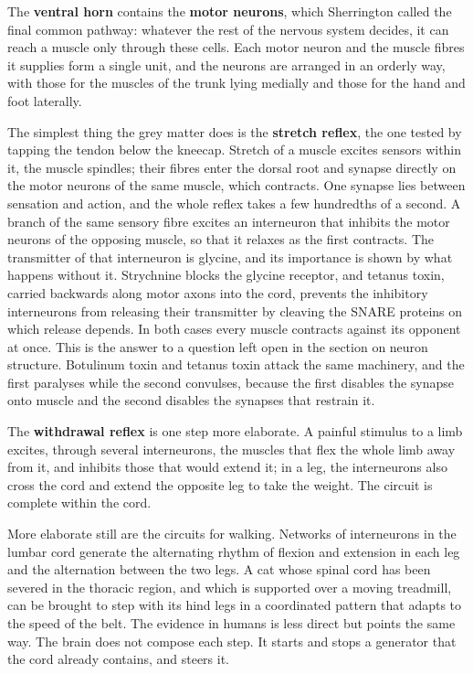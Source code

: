 \documentclass[11pt]{article}
\begin{document}
The \textbf{ventral horn} contains the \textbf{motor neurons}, which Sherrington called the final common pathway: whatever the rest of the nervous system decides, it can reach a muscle only through these cells. Each motor neuron and the muscle fibres it supplies form a single unit, and the neurons are arranged in an orderly way, with those for the muscles of the trunk lying medially and those for the hand and foot laterally.

The simplest thing the grey matter does is the \textbf{stretch reflex}, the one tested by tapping the tendon below the kneecap. Stretch of a muscle excites sensors within it, the muscle spindles; their fibres enter the dorsal root and synapse directly on the motor neurons of the same muscle, which contracts. One synapse lies between sensation and action, and the whole reflex takes a few hundredths of a second. A branch of the same sensory fibre excites an interneuron that inhibits the motor neurons of the opposing muscle, so that it relaxes as the first contracts. The transmitter of that interneuron is glycine, and its importance is shown by what happens without it. Strychnine blocks the glycine receptor, and tetanus toxin, carried backwards along motor axons into the cord, prevents the inhibitory interneurons from releasing their transmitter by cleaving the SNARE proteins on which release depends. In both cases every muscle contracts against its opponent at once. This is the answer to a question left open in the section on neuron structure. Botulinum toxin and tetanus toxin attack the same machinery, and the first paralyses while the second convulses, because the first disables the synapse onto muscle and the second disables the synapses that restrain it.

The \textbf{withdrawal reflex} is one step more elaborate. A painful stimulus to a limb excites, through several interneurons, the muscles that flex the whole limb away from it, and inhibits those that would extend it; in a leg, the interneurons also cross the cord and extend the opposite leg to take the weight. The circuit is complete within the cord.

More elaborate still are the circuits for walking. Networks of interneurons in the lumbar cord generate the alternating rhythm of flexion and extension in each leg and the alternation between the two legs. A cat whose spinal cord has been severed in the thoracic region, and which is supported over a moving treadmill, can be brought to step with its hind legs in a coordinated pattern that adapts to the speed of the belt. The evidence in humans is less direct but points the same way. The brain does not compose each step. It starts and stops a generator that the cord already contains, and steers it.
\end{document}
